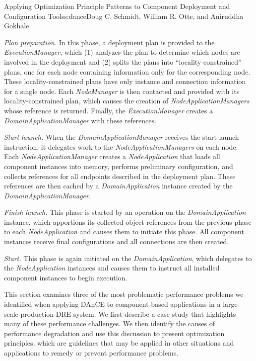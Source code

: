 \begin{aosachapter}{Applying Optimization Principle Patterns to Component Deployment and
                    Configuration Tools}{s:dance}{Doug C. Schmidt, William R. Otte, and Aniruddha Gokhale}
\begin{aosaenumerate}
\def\labelenumi{\arabic{enumi}.}
\item
  \emph{Plan preparation.} In this phase, a deployment plan is provided
  to the \emph{ExecutionManager}, which (1) analyzes the plan to
  determine which nodes are involved in the deployment and (2) splits
  the plans into ``locality-constrained'' plans, one for each node
  containing information only for the corresponding node. These
  locality-constrained plans have only instance and connection
  information for a single node. Each \emph{NodeManager} is then
  contacted and provided with its locality-constrained plan, which
  causes the creation of \emph{NodeApplicationManagers} whose reference
  is returned. Finally, the \emph{ExecutionManager} creates a
  \emph{DomainApplicationManager} with these references.
\item
  \emph{Start launch.} When the \emph{DomainApplicationManager} receives
  the start launch instruction, it delegates work to the
  \emph{NodeApplicationManagers} on each node. Each
  \emph{NodeApplicationManager} creates a \emph{NodeApplication} that
  loads all component instances into memory, performs preliminary
  configuration, and collects references for all endpoints described in
  the deployment plan. These references are then cached by a
  \emph{DomainApplication} instance created by the
  \emph{DomainApplicationManager}.
\item
  \emph{Finish launch.} This phase is started by an operation on the
  \emph{DomainApplication} instance, which apportions its collected
  object references from the previous phase to each
  \emph{NodeApplication} and causes them to initiate this phase. All
  component instances receive final configurations and all connections
  are then created.
\item
  \emph{Start.} This phase is again initiated on the
  \emph{DomainApplication}, which delegates to the
  \emph{NodeApplication} instances and causes them to instruct all
  installed component instances to begin execution.
\end{aosaenumerate}


\label{sec.opp}

This section examines three of the most problematic performance problems
we identified when applying DAnCE to component-based applications in a
large-scale production DRE system. We first describe a case study that
highlights many of these performance challenges. We then identify the
causes of performance degradation and use this discussion to present
optimization principles, which are guidelines that may be applied in
other situations and applications to remedy or prevent performance
problems.


\end{aosachapter}
